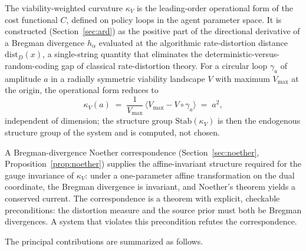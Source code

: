 \documentclass[11pt,a4paper]{article}
\theoremstyle{plain}
\theoremstyle{definition}
\theoremstyle{remark}
\newcommand{\kk}{\kappa_{\!V}}
\newcommand{\Stab}{\mathrm{Stab}}
\newcommand{\distD}{\mathrm{dist}_{D}}
\begin{document}
The viability-weighted curvature $\kk$ is the leading-order operational
form of the cost functional $C$, defined on policy loops in the agent
parameter space. It is constructed (Section~\ref{sec:ard}) as the
positive part of the directional derivative of a Bregman divergence
$h_\alpha$ evaluated at the algorithmic rate-distortion distance
$\distD(x)$, a single-string quantity that eliminates the
deterministic-versus-random-coding gap of classical rate-distortion
theory. For a circular loop $\gamma_a$ of amplitude $a$ in a radially
symmetric viability landscape $V$ with maximum $V_{\max}$ at the origin,
the operational form reduces to
\begin{equation}\label{eq:kappaV}
  \kk(a) \;=\; \frac{1}{V_{\max}}\,\langle V_{\max} - V\circ\gamma_a\rangle
  \;=\; a^2,
\end{equation}
independent of dimension; the structure group $\Stab(\kk)$ is then the
endogenous structure group of the system and is computed, not chosen.

A Bregman-divergence Noether correspondence
(Section~\ref{sec:noether}, Proposition~\ref{prop:noether}) supplies
the affine-invariant structure required for the gauge invariance of
$\kk$: under a one-parameter affine transformation on the dual
coordinate, the Bregman divergence is invariant, and Noether's theorem
yields a conserved current. The correspondence is a theorem with
explicit, checkable preconditions: the distortion measure and the
source prior must both be Bregman divergences. A system that violates
this precondition refutes the correspondence.

The principal contributions are summarized as follows.
\end{document}
